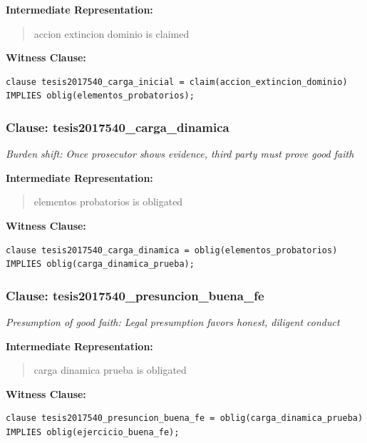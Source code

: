 \documentclass[11pt,a4paper]{article}
\begin{document}
\textbf{Intermediate Representation:}

\begin{quote}
accion extincion dominio is claimed
\end{quote}

\textbf{Witness Clause:}

\begin{lstlisting}[style=witnessstyle, language=Witness]
clause tesis2017540_carga_inicial = claim(accion_extincion_dominio) IMPLIES oblig(elementos_probatorios);
\end{lstlisting}

\subsubsection{Clause: tesis2017540\_carga\_dinamica}

\textit{Burden shift: Once prosecutor shows evidence, third party must prove good faith}

\textbf{Intermediate Representation:}

\begin{quote}
elementos probatorios is obligated
\end{quote}

\textbf{Witness Clause:}

\begin{lstlisting}[style=witnessstyle, language=Witness]
clause tesis2017540_carga_dinamica = oblig(elementos_probatorios) IMPLIES oblig(carga_dinamica_prueba);
\end{lstlisting}

\subsubsection{Clause: tesis2017540\_presuncion\_buena\_fe}

\textit{Presumption of good faith: Legal presumption favors honest, diligent conduct}

\textbf{Intermediate Representation:}

\begin{quote}
carga dinamica prueba is obligated
\end{quote}

\textbf{Witness Clause:}

\begin{lstlisting}[style=witnessstyle, language=Witness]
clause tesis2017540_presuncion_buena_fe = oblig(carga_dinamica_prueba) IMPLIES oblig(ejercicio_buena_fe);
\end{lstlisting}
\end{document}
